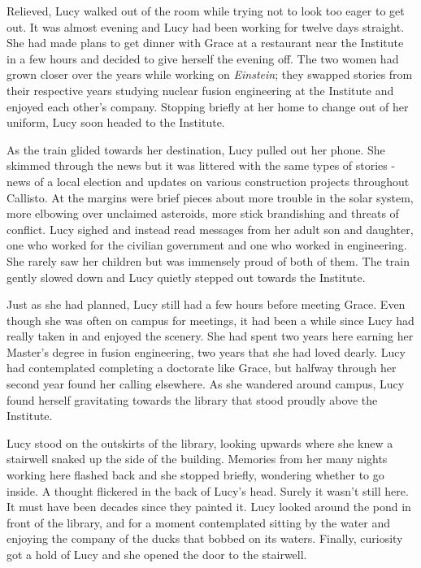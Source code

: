 \documentclass[12pt]{article} %
\begin{document}
Relieved, Lucy walked out of the room while trying not to look too eager to get out. It was almost evening and Lucy had been working for twelve days straight. She had made plans to get dinner with Grace at a restaurant near the Institute in a few hours and decided to give herself the evening off. The two women had grown closer over the years while working on \textit{Einstein}; they swapped stories from their respective years studying nuclear fusion engineering at the Institute and enjoyed each other's company. Stopping briefly at her home to change out of her uniform, Lucy soon headed to the Institute.

As the train glided towards her destination, Lucy pulled out her phone. She skimmed through the news but it was littered with the same types of stories - news of a local election and updates on various construction projects throughout Callisto. At the margins were brief pieces about more trouble in the solar system, more elbowing over unclaimed asteroids, more stick brandishing and threats of conflict. Lucy sighed and instead read messages from her adult son and daughter, one who worked for the civilian government and one who worked in engineering. She rarely saw her children but was immensely proud of both of them. The train gently slowed down and Lucy quietly stepped out towards the Institute.

Just as she had planned, Lucy still had a few hours before meeting Grace. Even though she was often on campus for meetings, it had been a while since Lucy had really taken in and enjoyed the scenery. She had spent two years here earning her Master's degree in fusion engineering, two years that she had loved dearly. Lucy had contemplated completing a doctorate like Grace, but halfway through her second year found her calling elsewhere. As she wandered around campus, Lucy found herself gravitating towards the library that stood proudly above the Institute. 

Lucy stood on the outskirts of the library, looking upwards where she knew a stairwell snaked up the side of the building. Memories from her many nights working here flashed back and she stopped briefly, wondering whether to go inside. A thought flickered in the back of Lucy's head. Surely it wasn't still here. It must have been decades since they painted it. Lucy looked around the pond in front of the library, and for a moment contemplated sitting by the water and enjoying the company of the ducks that bobbed on its waters. Finally, curiosity got a hold of Lucy and she opened the door to the stairwell.
\end{document}
